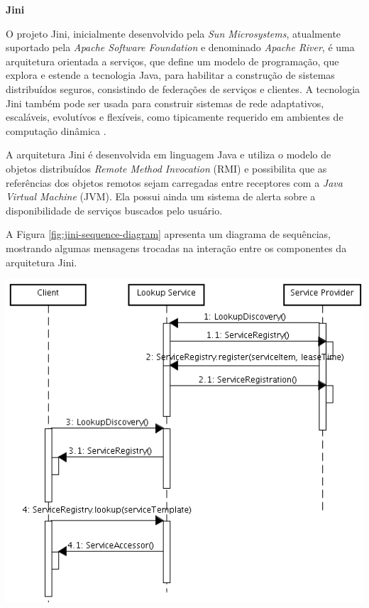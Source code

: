 \textbf{Jini}

O projeto Jini, inicialmente desenvolvido pela \textit{Sun Microsystems}, atualmente suportado pela \textit{Apache Software Foundation} e denominado \textit{Apache River}, é uma arquitetura orientada a serviços, que define um modelo de programação, que explora e estende a tecnologia Java, para habilitar a construção de sistemas distribuídos seguros, consistindo de federações de serviços e clientes. A tecnologia Jini também pode ser usada para construir sistemas de rede adaptativos, escaláveis, evolutívos e flexíveis, como tipicamente requerido em ambientes de computação dinâmica \cite{apache-river}.

A arquitetura Jini é desenvolvida em linguagem Java e utiliza o modelo de objetos distribuídos \textit{Remote Method Invocation} (RMI) e possibilita que as referências dos objetos remotos sejam carregadas entre receptores com a \textit{Java Virtual Machine} (JVM). Ela possui ainda um sistema de alerta sobre a disponibilidade de serviços buscados pelo usuário.

A Figura \ref{fig:jini-sequence-diagram} apresenta um diagrama de sequências, mostrando algumas mensagens trocadas na interação entre os componentes da arquitetura Jini.

\begin{center}
	\includegraphics[scale=0.6]{images/jini-sequence-diagram.png}
	\label{fig:jini-sequence-diagram}
\end{center}

